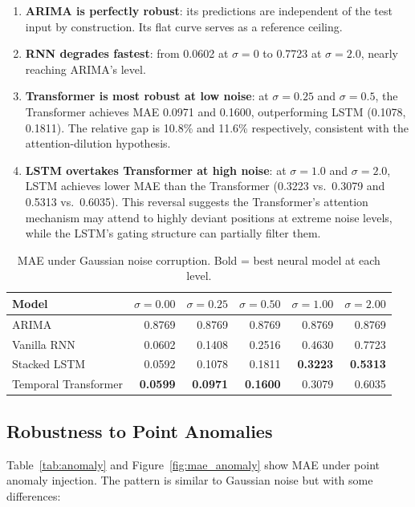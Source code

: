 \documentclass[runningheads]{llncs}
\begin{document}
\begin{enumerate}
  \item \textbf{ARIMA is perfectly robust}: its predictions are independent of the test input by construction. Its flat curve serves as a reference ceiling.
  \item \textbf{RNN degrades fastest}: from 0.0602 at $\sigma=0$ to 0.7723 at $\sigma=2.0$, nearly reaching ARIMA's level.
  \item \textbf{Transformer is most robust at low noise}: at $\sigma=0.25$ and $\sigma=0.5$, the Transformer achieves MAE 0.0971 and 0.1600, outperforming LSTM (0.1078, 0.1811). The relative gap is 10.8\% and 11.6\% respectively, consistent with the attention-dilution hypothesis.
  \item \textbf{LSTM overtakes Transformer at high noise}: at $\sigma=1.0$ and $\sigma=2.0$, LSTM achieves lower MAE than the Transformer (0.3223 vs.\ 0.3079 and 0.5313 vs.\ 0.6035). This reversal suggests the Transformer's attention mechanism may attend to highly deviant positions at extreme noise levels, while the LSTM's gating structure can partially filter them.
\end{enumerate}

\begin{table}[H]
\centering
\caption{MAE under Gaussian noise corruption. Bold = best neural model at each level.}
\label{tab:gaussian}
\begin{tabular}{lrrrrr}
\toprule
\textbf{Model} & $\sigma=0.00$ & $\sigma=0.25$ & $\sigma=0.50$ & $\sigma=1.00$ & $\sigma=2.00$ \\
\midrule
ARIMA               & 0.8769 & 0.8769 & 0.8769 & 0.8769 & 0.8769 \\
Vanilla RNN         & 0.0602 & 0.1408 & 0.2516 & 0.4630 & 0.7723 \\
Stacked LSTM        & 0.0592 & 0.1078 & 0.1811 & \textbf{0.3223} & \textbf{0.5313} \\
Temporal Transformer & \textbf{0.0599} & \textbf{0.0971} & \textbf{0.1600} & 0.3079 & 0.6035 \\
\bottomrule
\end{tabular}
\end{table}

\subsection{Robustness to Point Anomalies}
\label{sec:anomaly}

Table~\ref{tab:anomaly} and Figure~\ref{fig:mae_anomaly} show MAE under point anomaly injection. The pattern is similar to Gaussian noise but with some differences:
\end{document}
